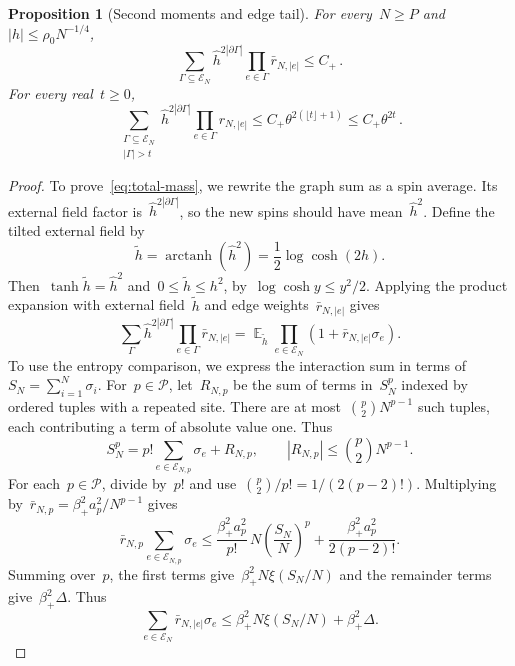 \documentclass[letterpaper,11pt,reqno]{amsart}
\renewcommand{\leq}{\leqslant}
\renewcommand{\geq}{\geqslant}
\DeclareMathOperator{\E}{\mathds{E}}
\newcommand{\hh}{\hat{h}}
\newtheorem{proposition}[theorem]{Proposition}
\begin{document}
\begin{proposition}[Second moments and edge tail]\label{prop:mass}
For every~$N\geq P$ and~$|h|\leq\rho_0N^{-1/4}$,
\begin{equation}\label{eq:total-mass}
\sum_{\Gamma\subseteq\mathcal E_N}\hh^{2|\partial\Gamma|}
\prod_{e\in\Gamma}\bar r_{N,|e|}\leq C_+\,.
\end{equation}
For every real~$t\geq0$,
\begin{equation}\label{eq:edge-tail}
\sum_{\substack{\Gamma\subseteq\mathcal E_N\\|\Gamma|>t}}
\hh^{2|\partial\Gamma|}\prod_{e\in\Gamma}r_{N,|e|}
\leq C_+\theta^{2(\lfloor t\rfloor+1)}\leq C_+\theta^{2t}\,.
\end{equation}
\end{proposition}
\begin{proof}
To prove~\eqref{eq:total-mass}, we rewrite the graph sum as a spin average. Its external field factor is~$\hh^{2|\partial\Gamma|}$, so the new spins should have mean~$\hh^2$. Define the tilted external field by
\begin{equation*}
\widetilde h=\operatorname{arctanh}(\hh^2)=\frac12\log\cosh(2h).
\end{equation*}
Then~$\tanh\widetilde h=\hh^2$ and~$0\leq\widetilde h\leq h^2$, by~$\log\cosh y\leq y^2/2$. Applying the product expansion with external field~$\widetilde h$ and edge weights~$\bar r_{N,|e|}$ gives
\begin{equation*}
\sum_\Gamma\hh^{2|\partial\Gamma|}\prod_{e\in\Gamma}\bar r_{N,|e|}
=\E_{\widetilde h}\prod_{e\in\mathcal E_N}(1+\bar r_{N,|e|}\sigma_e).
\end{equation*}
To use the entropy comparison, we express the interaction sum in terms of~$S_N=\sum_{i=1}^N\sigma_i$. For~$p\in\mathcal P$, let~$R_{N,p}$ be the sum of terms in~$S_N^p$ indexed by ordered tuples with a repeated site. There are at most~$\binom p2N^{p-1}$ such tuples, each contributing a term of absolute value one. Thus
\begin{equation*}
S_N^p=p!\sum_{e\in\mathcal E_{N,p}}\sigma_e+R_{N,p},
\qquad |R_{N,p}|\leq\binom p2N^{p-1}.
\end{equation*}
For each~$p\in\mathcal P$, divide by~$p!$ and use~$\binom p2/p!=1/(2(p-2)!)$. Multiplying by~$\bar r_{N,p}=\beta_+^2a_p^2/N^{p-1}$ gives
\begin{equation*}
\bar r_{N,p}\sum_{e\in\mathcal E_{N,p}}\sigma_e
\leq \frac{\beta_+^2a_p^2}{p!}\,N\left(\frac{S_N}{N}\right)^p
+\frac{\beta_+^2a_p^2}{2(p-2)!}.
\end{equation*}
Summing over~$p$, the first terms give~$\beta_+^2N\xi(S_N/N)$ and the remainder terms give~$\beta_+^2\Delta$. Thus
\begin{equation*}
\sum_{e\in\mathcal E_N}\bar r_{N,|e|}\sigma_e
\leq\beta_+^2N\xi(S_N/N)+\beta_+^2\Delta.
\end{equation*}


\end{proof}
\end{document}
